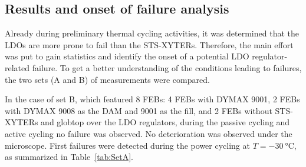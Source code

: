 \subsection{Results and onset of failure analysis}
Already during preliminary thermal cycling activities, it was determined that the \gls{LDO}s are more prone to fail than the STS-XYTERs. Therefore, the main effort was put to gain statistics and identify the onset of a potential \gls{LDO} regulator-related failure. To get a better understanding of the conditions leading to failures, the two sets (A and B) of measurements were compared. 


In the case of set B, which featured 8 \glspl{FEB}: 4 \glspl{FEB} with DYMAX 9001, 2 \glspl{FEB} with DYMAX 9008 as the DAM and 9001 as the fill, and 2 \glspl{FEB} without STS-XYTERs and globtop over the \gls{LDO} regulators, during the passive cycling and active cycling no failure was observed. No deterioration was observed under the microscope. First failures were detected during the power cycling at $T=\SI{-30}{\celsius}$, as summarized in Table~\ref{tab:SetA}. 

\begin{table}[!h]
\centering
\caption{Detailed description of the \gls{LDO} failure with regard to the type and number of cycles.}
\label{tab:SetA}
\end{table}

